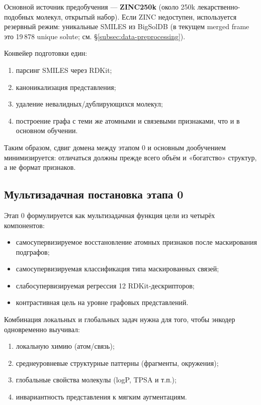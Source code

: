 \documentclass[11pt]{article}
\begin{document}
Основной источник предобучения --- \textbf{ZINC250k} (около 250k лекарственно-подобных молекул, открытый набор). Если ZINC недоступен, используется резервный режим: уникальные SMILES из BigSolDB (в текущем merged frame это 19\,878 unique solute; см. §\ref{subsec:data-preprocessing}).

Конвейер подготовки един:
\begin{enumerate}
  \item парсинг SMILES через RDKit;
  \item каноникализация представления;
  \item удаление невалидных/дублирующихся молекул;
  \item построение графа с теми же атомными и связевыми признаками, что и в основном обучении.
\end{enumerate}

Таким образом, сдвиг домена между этапом 0 и основным дообучением минимизируется: отличаться должны прежде всего объём и «богатство» структур, а не формат признаков.

\subsection{Мультизадачная постановка этапа 0}

Этап 0 формулируется как мультизадачная функция цели из четырёх компонентов:
\begin{itemize}
  \item самосупервизируемое восстановление атомных признаков после маскирования подграфов;
  \item самосупервизируемая классификация типа маскированных связей;
  \item слабосупервизируемая регрессия 12 RDKit-дескрипторов;
  \item контрастивная цель на уровне графовых представлений.
\end{itemize}

Комбинация локальных и глобальных задач нужна для того, чтобы энкодер одновременно выучивал:
\begin{enumerate}
  \item локальную химию (атом/связь);
  \item среднеуровневые структурные паттерны (фрагменты, окружения);
  \item глобальные свойства молекулы (logP, TPSA и т.п.);
  \item инвариантность представления к мягким аугментациям.
\end{enumerate}
\end{document}
